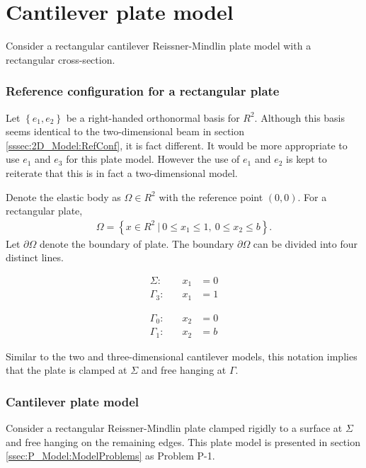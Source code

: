 \documentclass[../../main.tex]{subfiles}
\begin{document}
\section{Cantilever plate model}\label{sec:FEM:Plate}
Consider a rectangular cantilever Reissner-Mindlin plate model with a rectangular cross-section.

\subsubsection{Reference configuration for a rectangular plate}
Let $\left\{e_1,e_2\right\}$ be a right-handed orthonormal basis for $R^2$. Although this basis seems identical to the two-dimensional beam in section \ref{sssec:2D_Model:RefConf}, it is fact different. It would be more appropriate to use $e_1$ and $e_3$ for this plate model. However the use of $e_1$ and $e_2$ is kept to reiterate that this is in fact a two-dimensional model.

Denote the elastic body as $\Omega \in R^2$ with the reference point $(0,0)$. For a rectangular plate,
\begin{eqnarray*}
	\Omega = \left \{ x \in R^2 \ | \ 0 \leq x_1 \leq 1, \ 0 \leq x_2 \leq b \right \}.
\end{eqnarray*}
Let $\partial \Omega$ denote the boundary of plate. The boundary $\partial \Omega$ can be divided into four distinct lines.

\noindent\begin{minipage}{.5\linewidth}
	\begin{eqnarray*}
		\Sigma:& \quad x_1 &= 0\\
		\Gamma_3:& \quad x_1 &= 1
	\end{eqnarray*}
\end{minipage}%
\begin{minipage}{.5\linewidth}
	\begin{eqnarray*}
		\Gamma_0:& \quad x_2 &= 0\\
		\Gamma_1:& \quad x_2 &= b
	\end{eqnarray*}
\end{minipage}

Similar to the two and three-dimensional cantilever models, this notation implies that the plate is clamped at $\Sigma$ and free hanging at $\Gamma$.

\subsubsection{Cantilever plate model}
Consider a rectangular Reissner-Mindlin plate clamped rigidly to a surface at $\Sigma$ and free hanging on the remaining edges. This plate model is presented in section \ref{ssec:P_Model:ModelProblems} as Problem P-1.
\end{document}
